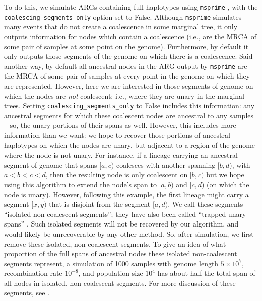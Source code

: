 \documentclass[10pt,twoside,lineno]{gsajnl}
\newcommand{\msprime}{\texttt{msprime}}
\begin{document}
To do this, we simulate ARGs containing full haplotypes using \msprime{}
\citep{kelleher2016efficient,baumdicker2021efficient},
with the \texttt{coalescing\_segments\_only} option set to False.
Although \msprime{} simulates many events that do not create a coalescence in some marginal tree,
it only outputs information for nodes which contain a coalescence
(i.e., are the MRCA of some pair of samples at some point on the genome).
Furthermore, by default it only outputs those segments of the genome
on which there is a coalescence.
Said another way, by default all ancestral nodes in the ARG
output by \msprime{} are the MRCA of some pair of samples at every point in the genome
on which they are represented.
However, here we are interested in those segments of genome
on which the nodes are \emph{not} coalescent;
i.e., where they are unary in the marginal trees.
Setting \texttt{coalescing\_segments\_only} to False includes this information:
any ancestral segments for which these coalescent nodes
are ancestral to any samples -- so, the unary portions of their spans as well.
However, this includes more information than we want:
we hope to recover those portions of ancestral haplotypes
on which the nodes are unary, but adjacent to a region of the genome where the node is not unary.
For instance, if a lineage carrying an ancestral segment of genome that spans $[a, c)$
coalesces with another spanning $[b, d)$, with $a < b < c < d$,
then the resulting node is only coalescent on $[b, c)$ but we hope using this algorithm
to extend the node's span to $[a, b)$ and $[c, d)$
(on which the node is unary).
However, following this example, the first lineage might carry a segment $[x, y)$
that is disjoint from the segment $[a, d)$.
We call these segments ``isolated non-coalescent segments'';
they have also been called ``trapped unary spans'' \citep[by][]{wong2024general}.
Such isolated segments will not be recovered by our algorithm,
and would likely be unrecoverable by any other method.
So, after simulation, we first remove these isolated, non-coalescent segments.
To give an idea of what proportion of the full spans of ancestral nodes
these isolated non-coalescent segments represent,
a simulation of 1000 samples
with genome length $5\times 10^7$, recombination rate $10^{-8}$, and population size $10^4$
has about half the total span of all nodes in isolated, non-coalescent segments.
For more discussion of these segments, see \citet{baumdicker2021efficient}.
\end{document}
